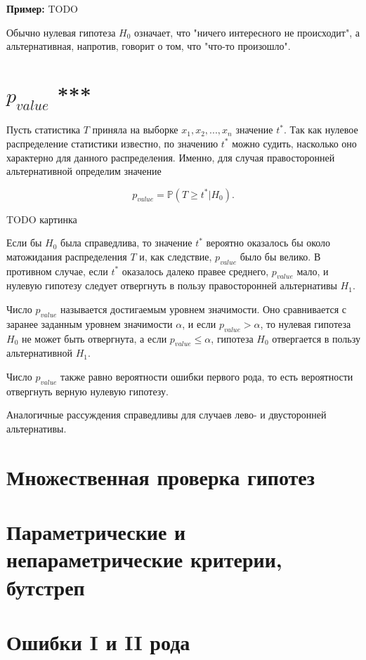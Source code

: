 \textbf{Пример:} TODO

Обычно нулевая гипотеза $H_0$ означает, что "ничего интересного не происходит", а альтернативная, напротив, говорит о том, что "что-то произошло".

\section{$p_{value}$ ***}

Пусть статистика $T$ приняла на выборке $x_1, x_2, ..., x_n$ значение $t^*$. Так как нулевое распределение статистики известно, по значению $t^*$ можно судить, насколько оно характерно для данного распределения. Именно, для случая правосторонней альтернативной определим значение

$$
p_{value} = \mathbb{P}(T \geqslant t^* | H_0).
$$

TODO картинка

Если бы $H_0$ была справедлива, то значение $t^*$ вероятно оказалось бы около матожидания распределения $T$ и, как следствие, $p_{value}$ было бы велико. В противном случае, если $t^*$ оказалось далеко правее среднего, $p_{value}$ мало, и нулевую гипотезу следует отвергнуть в пользу правосторонней альтернативы $H_1$.

Число $p_{value}$ называется достигаемым уровнем значимости. Оно сравнивается с заранее заданным уровнем значимости $\alpha$, и если $p_{value} > \alpha$, то нулевая гипотеза $H_0$ не может быть отвергнута, а если $p_{value} \leqslant \alpha$, гипотеза $H_0$ отвергается в пользу альтернативной $H_1$.

Число $p_{value}$ также равно вероятности ошибки первого рода, то есть вероятности отвергнуть верную нулевую гипотезу.

Аналогичные рассуждения справедливы для случаев лево- и двусторонней альтернативы.

\section{Множественная проверка гипотез}


\section{Параметрические и непараметрические критерии, бутстреп}


\section{Ошибки I и II рода}


